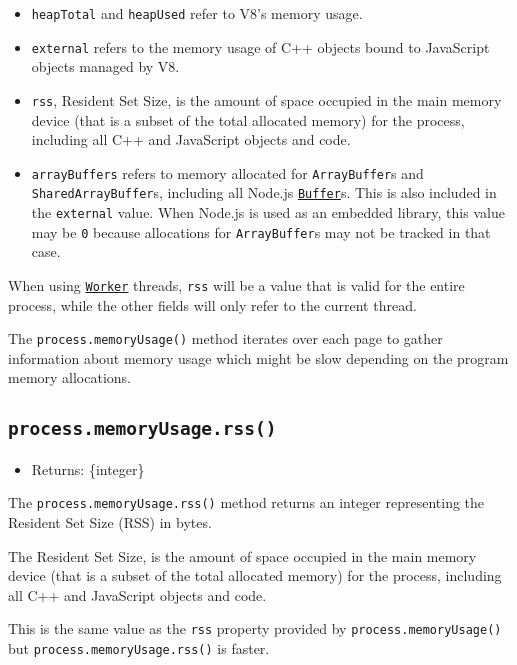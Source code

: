 \begin{itemize}
\tightlist
\item
  \texttt{heapTotal} and \texttt{heapUsed} refer to V8's memory usage.
\item
  \texttt{external} refers to the memory usage of C++ objects bound to
  JavaScript objects managed by V8.
\item
  \texttt{rss}, Resident Set Size, is the amount of space occupied in
  the main memory device (that is a subset of the total allocated
  memory) for the process, including all C++ and JavaScript objects and
  code.
\item
  \texttt{arrayBuffers} refers to memory allocated for
  \texttt{ArrayBuffer}s and \texttt{SharedArrayBuffer}s, including all
  Node.js \href{buffer.md}{\texttt{Buffer}}s. This is also included in
  the \texttt{external} value. When Node.js is used as an embedded
  library, this value may be \texttt{0} because allocations for
  \texttt{ArrayBuffer}s may not be tracked in that case.
\end{itemize}

When using \href{worker_threads.md\#class-worker}{\texttt{Worker}}
threads, \texttt{rss} will be a value that is valid for the entire
process, while the other fields will only refer to the current thread.

The \texttt{process.memoryUsage()} method iterates over each page to
gather information about memory usage which might be slow depending on
the program memory allocations.

\subsection{\texorpdfstring{\texttt{process.memoryUsage.rss()}}{process.memoryUsage.rss()}}\label{process.memoryusage.rss}

\begin{itemize}
\tightlist
\item
  Returns: \{integer\}
\end{itemize}

The \texttt{process.memoryUsage.rss()} method returns an integer
representing the Resident Set Size (RSS) in bytes.

The Resident Set Size, is the amount of space occupied in the main
memory device (that is a subset of the total allocated memory) for the
process, including all C++ and JavaScript objects and code.

This is the same value as the \texttt{rss} property provided by
\texttt{process.memoryUsage()} but \texttt{process.memoryUsage.rss()} is
faster.

